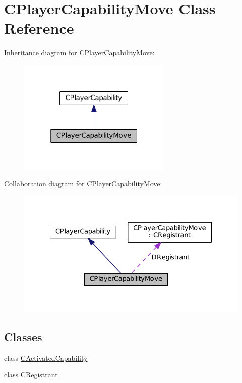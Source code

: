 \hypertarget{classCPlayerCapabilityMove}{}\section{C\+Player\+Capability\+Move Class Reference}
\label{classCPlayerCapabilityMove}


Inheritance diagram for C\+Player\+Capability\+Move\+:\nopagebreak
\begin{figure}[H]
\begin{center}
\leavevmode
\includegraphics[width=208pt]{classCPlayerCapabilityMove__inherit__graph}
\end{center}
\end{figure}


Collaboration diagram for C\+Player\+Capability\+Move\+:\nopagebreak
\begin{figure}[H]
\begin{center}
\leavevmode
\includegraphics[width=328pt]{classCPlayerCapabilityMove__coll__graph}
\end{center}
\end{figure}
\subsection*{Classes}
\begin{DoxyCompactItemize}
\item 
class \hyperlink{classCPlayerCapabilityMove_1_1CActivatedCapability}{C\+Activated\+Capability}
\item 
class \hyperlink{classCPlayerCapabilityMove_1_1CRegistrant}{C\+Registrant}
\end{DoxyCompactItemize}

